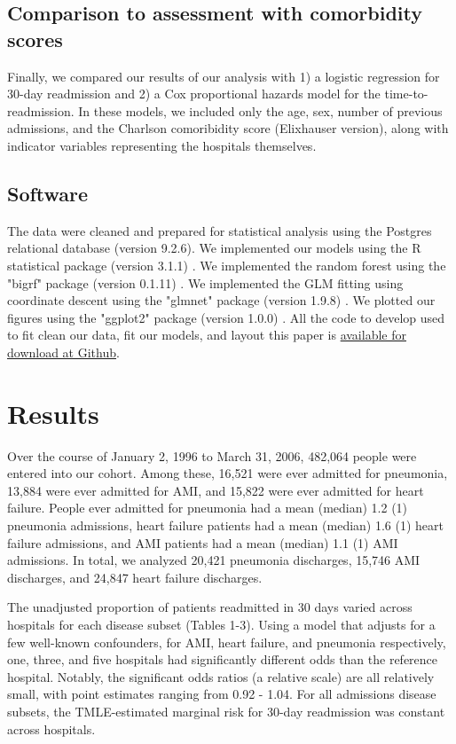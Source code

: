 \documentclass[]{article}\usepackage[]{graphicx}\usepackage[]{color}
\begin{document}
\subsection{Comparison to assessment with comorbidity scores}
Finally, we compared our results of our analysis with 1) a logistic regression for 30-day readmission and 2) a Cox proportional hazards model for the time-to-readmission. In these models, we included only the age, sex, number of previous admissions, and the Charlson comoribidity score (Elixhauser version), along with indicator variables representing the hospitals themselves.

\subsection{Software}
The data were cleaned and prepared for statistical analysis using the Postgres relational database (version 9.2.6). We implemented our models using the R statistical package (version 3.1.1) \supercite{team_r:_2014}. We implemented the random forest using the "bigrf" package (version 0.1.11) \supercite{lim_bigrf:_2014}. We implemented the GLM fitting using coordinate descent using the "glmnet" package (version 1.9.8) \supercite{friedman_regularization_2010}. We plotted our figures using the "ggplot2" package (version 1.0.0) \supercite{wickham_ggplot2:_2009}. All the code to develop used to fit clean our data, fit our models, and layout this paper is \href{https://github.com/nograpes/tmle_readmissions}{available for download at Github}.

\section{Results}


Over the course of January 2, 1996 to March 31, 2006, 482,064 people were entered into our cohort. Among these, 16,521 were ever admitted for pneumonia, 13,884 were ever admitted for AMI, and 15,822 were ever admitted for heart failure. People ever admitted for pneumonia had a mean (median) 1.2 (1) pneumonia admissions, heart failure patients had a mean (median) 1.6 (1) heart failure admissions, and AMI patients had a mean (median) 1.1 (1) AMI admissions. In total, we analyzed 20,421 pneumonia discharges, 15,746 AMI discharges, and 24,847 heart failure discharges.



The unadjusted proportion of patients readmitted in 30 days varied across hospitals for each disease subset (Tables 1-3). Using a model that adjusts for a few well-known confounders, for AMI, heart failure, and pneumonia respectively, one, three, and five hospitals had significantly different odds than the reference hospital. Notably, the significant odds ratios (a relative scale) are all relatively small, with point estimates ranging from 0.92 - 1.04. For all admissions disease subsets, the TMLE-estimated marginal risk for 30-day readmission was constant across hospitals. 
\end{document}
